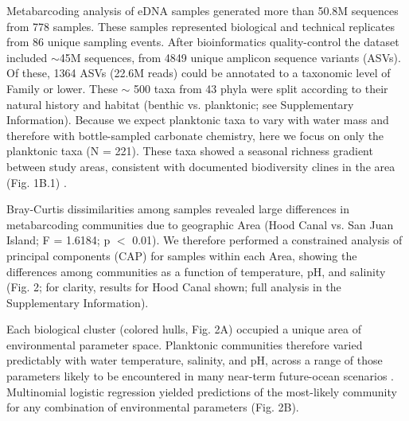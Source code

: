 \documentclass[11pt]{article}
\begin{document}
\begin{linenumbers}
Metabarcoding analysis of eDNA samples generated more than 50.8M sequences from 778 samples. These samples represented biological and technical replicates from 86 unique sampling events. After bioinformatics quality-control the dataset included $\sim${}45M sequences, from 4849 unique amplicon sequence variants (ASVs). Of these, 1364 ASVs (22.6M reads) could be annotated to a taxonomic level of Family or lower. These $\sim$ 500 taxa from 43 phyla were split according to their natural history and habitat (benthic vs. planktonic; see Supplementary Information). Because we expect planktonic taxa to vary with water mass \cite{kelly2018tides} and therefore with bottle-sampled carbonate chemistry, here we focus on only the planktonic taxa (N = 221). These taxa showed a seasonal richness gradient between study areas, consistent with documented biodiversity clines in the area (Fig. 1B.1) \cite{dethier_decadal_2008}.

Bray-Curtis dissimilarities among samples revealed large differences in metabarcoding communities due to geographic Area (Hood Canal vs. San Juan Island; F = 1.6184; p $<$ 0.01). We therefore performed a constrained analysis of principal components (CAP) for samples within each Area, showing the differences among communities as a function of temperature, pH, and salinity (Fig. 2; for clarity, results for Hood Canal shown; full analysis in the Supplementary Information). 

 Each biological cluster (colored hulls, Fig. 2A) occupied a unique area of environmental parameter space. Planktonic communities therefore varied predictably with water temperature, salinity, and pH, across a range of those parameters likely to be encountered in many near-term future-ocean scenarios \cite{murray2015inland}. 
 Multinomial logistic regression yielded predictions of the most-likely community for any combination of environmental parameters (Fig. 2B).


\end{linenumbers}
\end{document}
